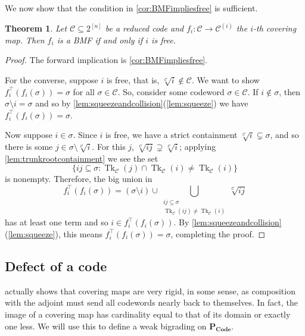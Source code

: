 \documentclass[11pt,letterpaper, reqno]{amsart}
\newtheorem{thm}{Theorem}[section]   %
\theoremstyle{definition}
\DeclareMathOperator{\tk}{Tk}
\def\cC{\mathcal{C}}
\def\pcode{\mathbf{P_{Code}}}
\begin{document}
        We now show that the condition in \cref{cor:BMFimpliesfree} is sufficient.

        \begin{thm}\label{thm:coveringBMF}
            Let $\cC \subseteq 2^{[n]}$ be a reduced code and $f_i: \cC \to \cC^{(i)}$ the $i$-th covering map.
            Then $f_i$ is a BMF if and only if $i$ is free.
        \end{thm}
        
        \begin{proof}
            The forward implication is \cref{cor:BMFimpliesfree}.%
            
            For the converse, suppose $i$ is free, that is, $\sqrt[\cC]{i} \notin \cC$. We want to show $f_i^\top(f_i(\sigma)) = \sigma$ for all $\sigma \in \cC$. So, consider some codeword $\sigma \in \cC$. If $i \notin \sigma$, then $\sigma\setminus i = \sigma$ and so by \cref{lem:squeezeandcollision}(\ref{lem:squeeze}) we have $f_i^\top(f_i(\sigma)) = \sigma$.
            
            Now suppose $i \in \sigma$.
            Since $i$ is free, we have a strict containment $\sqrt[\cC]{i} \subsetneq \sigma$, and so there is some $j \in \sigma \setminus \sqrt[\cC]{i}$.
            For this $j$, $\sqrt[\cC]{ij} \supsetneq \sqrt[\cC]{i}$; applying \cref{lem:trunkrootcontainment} we see the set
                \[\{ij \subseteq \sigma : \tk_\cC(j) \cap \tk_\cC(i) \neq \tk_\cC(i)\}\]
            is nonempty. Therefore, the big union in 
                \[ f_i^\top(f_i(\sigma)) = (\sigma \setminus i) \cup \bigcup_{\substack{ij\subseteq \sigma \\\tk_\cC(ij) \neq \tk_\cC(i)}} \sqrt[\cC]{ij} \]
            has at least one term and so $i \in f_i^\top(f_i(\sigma))$. By \cref{lem:squeezeandcollision}(\ref{lem:squeeze}), this means $f_i^\top(f_i(\sigma)) = \sigma$, completing the proof.
        \end{proof}

    \subsection{Defect of a code}\label{sec:defect}
         actually shows that covering maps are very rigid, in some sense, 
        as composition with the adjoint must send all codewords nearly back to themselves. 
        In fact, the image of a covering map has cardinality equal to that of its domain or exactly one less. We will use this to define a weak bigrading on $\pcode$.
\end{document}

